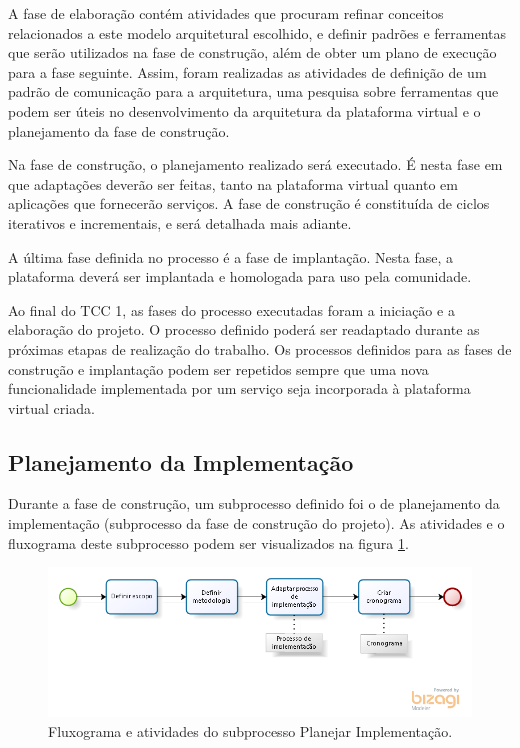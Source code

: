 A fase de elaboração contém atividades que procuram refinar conceitos relacionados a este modelo arquitetural escolhido, e definir padrões e ferramentas que serão utilizados na fase de construção, além de obter um plano de execução para a fase seguinte. Assim, foram realizadas as atividades de definição de um padrão de comunicação para a arquitetura, uma pesquisa sobre ferramentas que podem ser úteis no desenvolvimento da arquitetura da plataforma virtual e o planejamento da fase de construção.

Na fase de construção, o planejamento realizado será executado. É nesta fase em que adaptações deverão ser feitas, tanto na plataforma virtual quanto em aplicações que fornecerão serviços. A fase de construção é constituída de ciclos iterativos e incrementais, e será detalhada mais adiante.

A última fase definida no processo é a fase de implantação. Nesta fase, a plataforma deverá ser implantada e homologada para uso pela comunidade.

Ao final do TCC 1, as fases do processo executadas foram a iniciação e a elaboração do projeto. O processo definido poderá ser readaptado durante as próximas etapas de realização do trabalho. Os processos definidos para as fases de construção e implantação podem ser repetidos sempre que uma nova funcionalidade implementada por um serviço seja incorporada à plataforma virtual criada.

\subsection{Planejamento da Implementação}
Durante a fase de construção, um subprocesso definido foi o de planejamento da implementação (subprocesso da fase de construção do projeto). As atividades e o fluxograma deste subprocesso podem ser visualizados na figura \ref{subprocesso_planejamento}.

\begin{figure}[htb]
\centering
\includegraphics[width=1\textwidth]{figuras/subprocesso_planejamento.PNG}
\caption{Fluxograma e atividades do subprocesso Planejar Implementação.}
\label{subprocesso_planejamento}
\end{figure}


